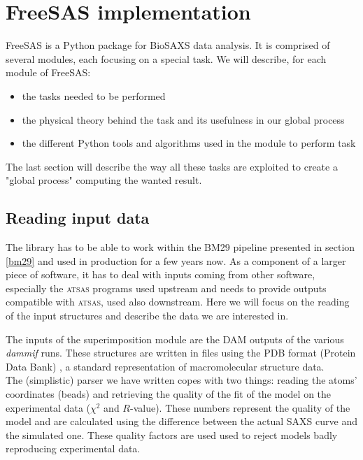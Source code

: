 \documentclass[a4paper, 11pt]{report}
\begin{document}
\chapter{FreeSAS implementation}

FreeSAS is a Python package for BioSAXS data analysis. 
It is comprised of several modules, each focusing on a special task. 
We will describe, for each module of FreeSAS:
\begin{itemize}
 \item the tasks needed to be performed
 \item the physical theory behind the task and its usefulness in our 
       global process
 \item the different Python tools and algorithms used in the module to 
       perform task
\end{itemize}
The last section will describe the way all these tasks are exploited 
to create a "global process" computing the wanted result. 

\section{Reading input data}

The library has to be able to work within the BM29 pipeline presented 
in section \ref{bm29} and used in production for a few years  now. 
As a component of a larger piece of software, it has to deal with 
inputs coming from other software, especially the \textsc{atsas} 
programs used upstream and needs to provide outputs compatible with 
\textsc{atsas}, used also downstream. 
Here we will focus on the reading of the input structures and describe the
data we are interested in.

The inputs of the superimposition module are the DAM outputs of the 
various \textit{dammif} runs. 
These structures are written in files using the PDB format (Protein 
Data Bank) \cite{pdb}, a standard representation of macromolecular 
structure data.\\
The (simplistic) parser we have written copes with two things: reading 
the atoms' coordinates (beads) and retrieving the quality of the fit 
of the model on the experimental data ($\chi^2$ and $R$-value). 
These numbers represent the quality of the model and are calculated 
using the difference between the actual SAXS curve and the simulated 
one. 
These quality factors are used used to reject models badly reproducing 
experimental data.
\end{document}
